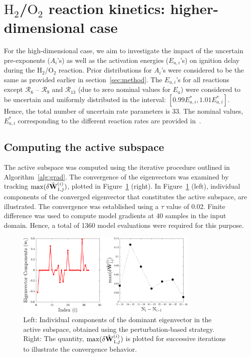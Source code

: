 \section{$\text{H}_2$/$\text{O}_2$ reaction kinetics: higher-dimensional case}
\label{sec:app}

For the high-dimensional case, we aim to investigate the impact of the uncertain
pre-exponents ($A_i$'s) as well as the activation energies ($E_{a,i}$'s) on ignition 
delay during the H$_2$/O$_2$ reaction.  Prior distributions for $A_i$'s were considered
to be the same as provided earlier in section~\ref{sec:method}. The $E_{a,i}$'s for all
reactions except $\mathcal{R}_6$ -- $\mathcal{R}_9$ and $\mathcal{R}_{13}$ (due to 
zero nominal values for $E_a$)
were considered to be uncertain and uniformly distributed in the interval: 
$[0.99E_{a,i}^\ast, 1.01E_{a,i}^\ast]$. Hence, the total number of uncertain rate parameters
is 33. The nominal values, $E_{a,i}^\ast$
corresponding to the different reaction rates are provided in~\cite{Yetter:1991}. 

\subsection{Computing the active subspace}

The active subspace was computed using the iterative procedure outlined in Algorithm~\ref{alg:grad}.
The convergence of the eigenvectors
was examined by tracking $\max(\delta \hat{\mathbf{{W}}}_{1,j}^{(i)})$, plotted in 
Figure~\ref{fig:conv_app} (right). In Figure~\ref{fig:conv_app} (left), individual
components of the converged eigenvector that constitutes the active subspace,
are illustrated. The convergence was established using
a $\tau$ value of 0.02. Finite difference was used to compute model gradients at 40 samples in
the input domain. Hence, a total of 1360 model evaluations were required for this purpose.  
%
\begin{figure}[htbp]
 \begin{center}
  \includegraphics[width=0.8\textwidth]{./Figures/eigv10}
\caption{Left: Individual components of the dominant eigenvector in the
active subspace,
obtained using the perturbation-based strategy. Right: The quantity,  
$\max(\delta \hat{\mathbf{{W}}}_{1,j}^{(i)})$
is plotted for successive iterations to illustrate the convergence behavior.}
\label{fig:conv_app}
\end{center}
\end{figure}
%
 
